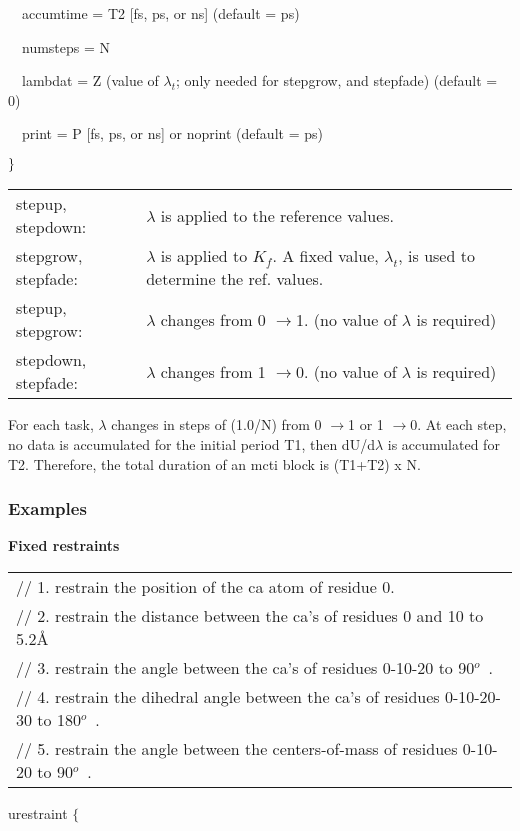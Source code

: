 ~~accumtime = T2 [fs, ps, or ns] (default = ps)

~~numsteps = N

~~lambdat = Z (value of $\lambda _{t}$; only needed for stepgrow, and
stepfade) (default = 0)

~~print = P [fs, ps, or ns] or noprint (default = ps)

$\}\medskip $

\begin{tabular}{ll}
stepup, stepdown: & $\lambda $ is applied to the reference values. \\ 
stepgrow, stepfade: & $\lambda $ is applied to $K_{f}$. A fixed value, $
\lambda _{t}$, is used to determine the ref. values. \\ 
stepup, stepgrow: & $\lambda $ changes from 0 $\rightarrow $1. (no value of $
\lambda $ is required) \\ 
stepdown, stepfade: & $\lambda $ changes from 1 $\rightarrow $0. (no value
of $\lambda $ is required)\medskip
\end{tabular}

For each task, $\lambda $ changes in steps of (1.0/N) from 0 $\rightarrow $1
or 1 $\rightarrow $0. At each step, no data is accumulated for the initial
period T1, then dU/d$\lambda $ is accumulated for T2. Therefore, the total
duration of an mcti block is (T1+T2) x N.

\subsubsection{Examples}

{\bf Fixed restraints}

\begin{tabular}{l}
{\footnotesize // 1. restrain the position of the ca atom of residue 0.} \\ 
{\footnotesize // 2. restrain the distance between the ca's of residues 0
and 10 to 5.2\AA } \\ 
{\footnotesize // 3. restrain the angle between the ca's of residues 0-10-20
to 90}$^{o}${\footnotesize \ .} \\ 
{\footnotesize // 4. restrain the dihedral angle between the ca's of
residues 0-10-20-30 to 180}$^{o}${\footnotesize \ .} \\ 
{\footnotesize // 5. restrain the angle between the centers-of-mass of
residues 0-10-20 to 90}$^{o}${\footnotesize \ .}
\end{tabular}

urestraint $\{$

